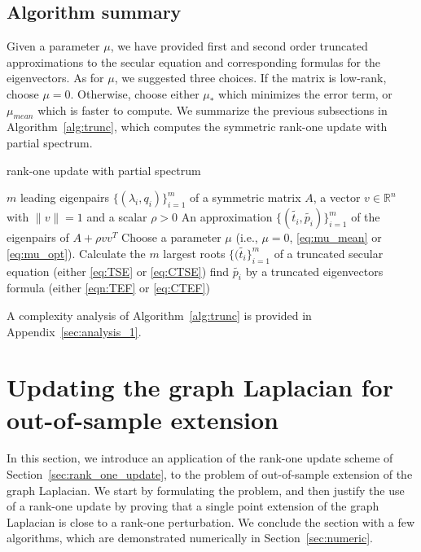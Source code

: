 \documentclass[11pt]{article}
\begin{document}
\subsection{Algorithm summary}

Given a parameter $\mu$, we have provided first and second order truncated approximations to the secular equation and corresponding formulas for the eigenvectors. As for $\mu$, we suggested three choices. If the matrix is low-rank, choose $\mu = 0$. Otherwise, choose either $\mu_\ast$ which minimizes the error term, or $\mu_{mean}$ which is faster to compute. We summarize the previous subsections in Algorithm~\ref{alg:trunc}, which computes the symmetric rank-one update with partial spectrum.

\begin{algorithm}[ht]
\caption{rank-one update with partial spectrum}
\label{alg:trunc}
\begin{algorithmic}[1]
\REQUIRE $m$ leading eigenpairs $\{(\lambda_i,q_i)\}_{i=1}^m$ of a symmetric matrix $A$, a vector $v \in \mathbb{R}^n$ with $\|v\| = 1$ and a scalar $\rho > 0$
\ENSURE An approximation $ \{(\widetilde{t_i},\widetilde{p_i})\}_{i=1}^m$ of the eigenpairs of $A + \rho vv^T$
\STATE Choose a parameter $\mu$ (i.e., $\mu=0$, \eqref{eq:mu_mean} or \eqref{eq:mu_opt}). \label{alg1:line1}
\STATE Calculate the $m$ largest roots  $\{(\widetilde{t_i}\}_{i=1}^m$ of a truncated secular equation (either \eqref{eq:TSE} or \eqref{eq:CTSE}) \label{alg1:line2}
\STATE  find $\widetilde{p_i}$ by a truncated eigenvectors formula (either \eqref{eqn:TEF} or \eqref{eq:CTEF}) \label{alg1:line4}
\ENDFOR
\end{algorithmic}
\end{algorithm}
A complexity analysis of Algorithm~\ref{alg:trunc} is provided in Appendix~\ref{sec:analysis_1}. 

\section{Updating the graph Laplacian for out-of-sample extension} \label{sec:updating_problem} 

In this section, we introduce an application of the rank-one update scheme of Section~\ref{sec:rank_one_update}, to the problem of out-of-sample extension of the graph Laplacian. We start by formulating the problem, and then justify the use of a rank-one update by proving that a single point extension of the graph Laplacian is close to a rank-one perturbation. We conclude the section with a few algorithms, which are demonstrated numerically in Section~\ref{sec:numeric}.
\end{document}
